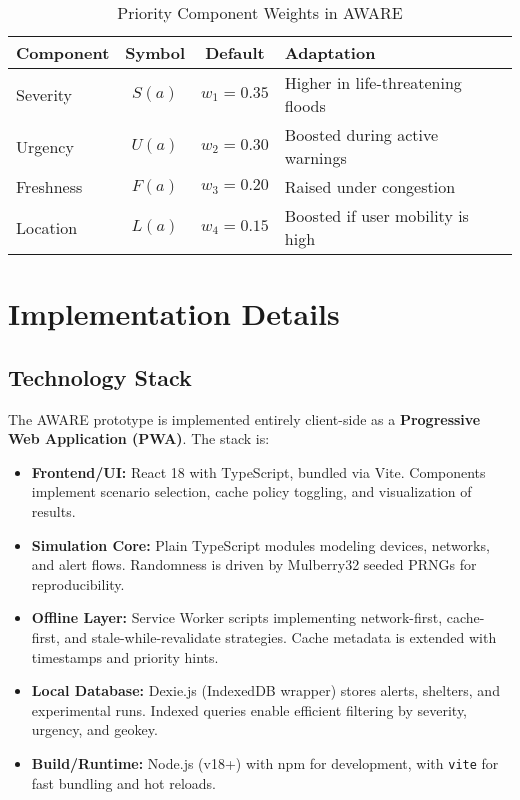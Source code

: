 \documentclass[11pt,twocolumn]{article}
\begin{document}
\begin{table}[t]
\centering
\caption{Priority Component Weights in AWARE}
\label{tab:priority-weights}
\setlength{\tabcolsep}{4pt}
\footnotesize
\begin{tabularx}{\linewidth}{@{}l c c >{\raggedright\arraybackslash}X@{}}
\toprule
\textbf{Component} & \textbf{Symbol} & \textbf{Default} & \textbf{Adaptation} \\ \midrule
Severity  & $S(a)$ & $w_1=0.35$ & Higher in life-threatening floods \\
Urgency   & $U(a)$ & $w_2=0.30$ & Boosted during active warnings \\
Freshness & $F(a)$ & $w_3=0.20$ & Raised under congestion \\
Location  & $L(a)$ & $w_4=0.15$ & Boosted if user mobility is high \\
\bottomrule
\end{tabularx}
\vspace{-4pt}
\end{table}

\section{Implementation Details}

\subsection{Technology Stack}

The AWARE prototype is implemented entirely client-side as a \textbf{Progressive Web Application (PWA)}. The stack is:

\begin{itemize}
    \item \textbf{Frontend/UI:} React 18 with TypeScript, bundled via Vite. Components implement scenario selection, cache policy toggling, and visualization of results.
    \item \textbf{Simulation Core:} Plain TypeScript modules modeling devices, networks, and alert flows. Randomness is driven by Mulberry32 seeded PRNGs for reproducibility.
    \item \textbf{Offline Layer:} Service Worker scripts implementing network-first, cache-first, and stale-while-revalidate strategies. Cache metadata is extended with timestamps and priority hints.
    \item \textbf{Local Database:} Dexie.js (IndexedDB wrapper) stores alerts, shelters, and experimental runs. Indexed queries enable efficient filtering by severity, urgency, and geokey.
    \item \textbf{Build/Runtime:} Node.js (v18+) with npm for development, with \texttt{vite} for fast bundling and hot reloads.
\end{itemize}
\end{document}
